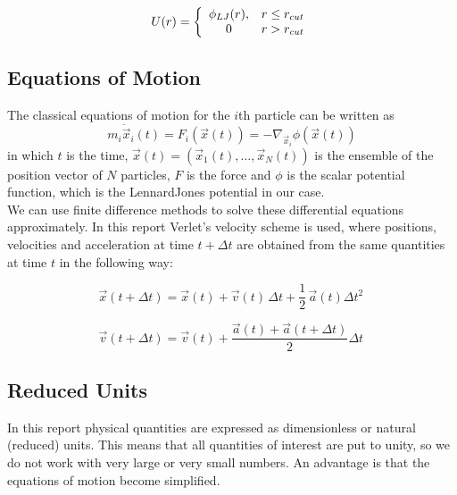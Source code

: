 \documentclass{article}
\begin{document}
\begin{equation}
 U(r)=\left\{
\begin{array}{c l}      
    \phi_{LJ}(r), & r \le r_{cut}\\
    0 & r>r_{cut}
\end{array}\right.
\end{equation}

\subsection{Equations of Motion}
The classical equations of motion for the $i$th particle can be written as
\begin{equation}
m_i\ddot {\vec x}_i(t)=F_i(\vec x(t))=-\nabla_{\vec x_i} \phi(\vec x(t))\end{equation}
in which $t$ is the time, $\vec x(t)=(\vec x_1(t),\ldots,\vec x_N(t))$ is the ensemble of the position vector of $N$ particles, $F$ is the force and $\phi$ is the scalar potential function, which is the Lennard\text{-}Jones potential in our case.\\

We can use finite difference methods to solve these differential equations approximately. In this report Verlet's velocity scheme is used, where positions, velocities and acceleration at time $t+\Delta t$ are obtained from the same quantities at time $t$ in the following way:



\begin{equation}
\label{verlet1}
\vec{x}(t + \Delta t) = \vec{x}(t) + \vec{v}(t)\, \Delta t + \frac{1}{2} \,\vec{a}(t) \Delta t^2  \,
\end{equation}


\begin{equation}
\label{verlet2}
\vec{v}(t + \Delta t) = \vec{v}(t) + \frac{\vec{a}(t) + \vec{a}(t + \Delta t)}{2} \Delta t  \,
\end{equation}

\subsection{Reduced Units}
\label{reduced}
In this report physical quantities are expressed as dimensionless or natural (reduced) units. This means that all quantities of interest are put to unity, so we do not work with very large or very small numbers. An advantage is that the equations of motion become simplified.\\
\end{document}
